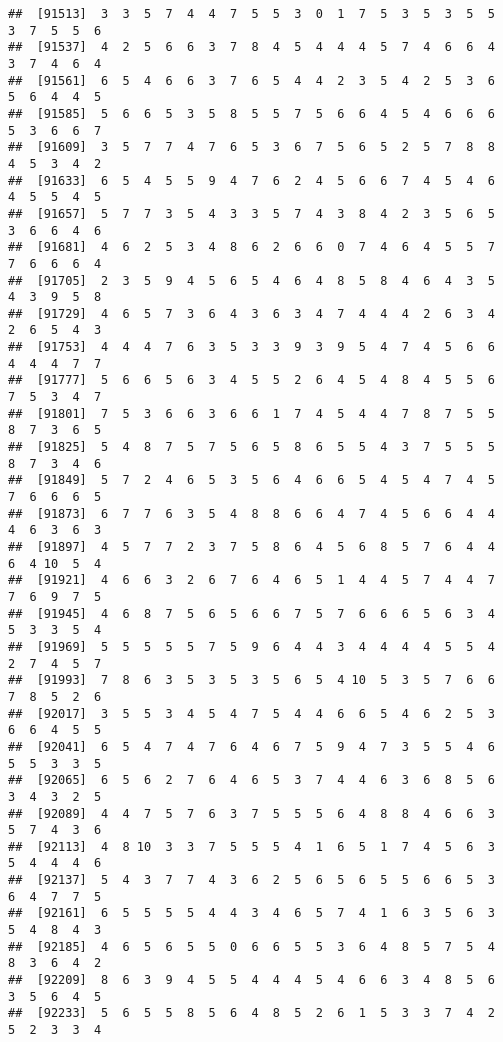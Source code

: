 \documentclass[
]{book}
\begin{document}
\begin{verbatim}
##  [91513]  3  3  5  7  4  4  7  5  5  3  0  1  7  5  3  5  3  5  5  3  7  5  5  6
##  [91537]  4  2  5  6  6  3  7  8  4  5  4  4  4  5  7  4  6  6  4  3  7  4  6  4
##  [91561]  6  5  4  6  6  3  7  6  5  4  4  2  3  5  4  2  5  3  6  5  6  4  4  5
##  [91585]  5  6  6  5  3  5  8  5  5  7  5  6  6  4  5  4  6  6  6  5  3  6  6  7
##  [91609]  3  5  7  7  4  7  6  5  3  6  7  5  6  5  2  5  7  8  8  4  5  3  4  2
##  [91633]  6  5  4  5  5  9  4  7  6  2  4  5  6  6  7  4  5  4  6  4  5  5  4  5
##  [91657]  5  7  7  3  5  4  3  3  5  7  4  3  8  4  2  3  5  6  5  3  6  6  4  6
##  [91681]  4  6  2  5  3  4  8  6  2  6  6  0  7  4  6  4  5  5  7  7  6  6  6  4
##  [91705]  2  3  5  9  4  5  6  5  4  6  4  8  5  8  4  6  4  3  5  4  3  9  5  8
##  [91729]  4  6  5  7  3  6  4  3  6  3  4  7  4  4  4  2  6  3  4  2  6  5  4  3
##  [91753]  4  4  4  7  6  3  5  3  3  9  3  9  5  4  7  4  5  6  6  4  4  4  7  7
##  [91777]  5  6  6  5  6  3  4  5  5  2  6  4  5  4  8  4  5  5  6  7  5  3  4  7
##  [91801]  7  5  3  6  6  3  6  6  1  7  4  5  4  4  7  8  7  5  5  8  7  3  6  5
##  [91825]  5  4  8  7  5  7  5  6  5  8  6  5  5  4  3  7  5  5  5  8  7  3  4  6
##  [91849]  5  7  2  4  6  5  3  5  6  4  6  6  5  4  5  4  7  4  5  7  6  6  6  5
##  [91873]  6  7  7  6  3  5  4  8  8  6  6  4  7  4  5  6  6  4  4  4  6  3  6  3
##  [91897]  4  5  7  7  2  3  7  5  8  6  4  5  6  8  5  7  6  4  4  6  4 10  5  4
##  [91921]  4  6  6  3  2  6  7  6  4  6  5  1  4  4  5  7  4  4  7  7  6  9  7  5
##  [91945]  4  6  8  7  5  6  5  6  6  7  5  7  6  6  6  5  6  3  4  5  3  3  5  4
##  [91969]  5  5  5  5  5  7  5  9  6  4  4  3  4  4  4  4  5  5  4  2  7  4  5  7
##  [91993]  7  8  6  3  5  3  5  3  5  6  5  4 10  5  3  5  7  6  6  7  8  5  2  6
##  [92017]  3  5  5  3  4  5  4  7  5  4  4  6  6  5  4  6  2  5  3  6  6  4  5  5
##  [92041]  6  5  4  7  4  7  6  4  6  7  5  9  4  7  3  5  5  4  6  5  5  3  3  5
##  [92065]  6  5  6  2  7  6  4  6  5  3  7  4  4  6  3  6  8  5  6  3  4  3  2  5
##  [92089]  4  4  7  5  7  6  3  7  5  5  5  6  4  8  8  4  6  6  3  5  7  4  3  6
##  [92113]  4  8 10  3  3  7  5  5  5  4  1  6  5  1  7  4  5  6  3  5  4  4  4  6
##  [92137]  5  4  3  7  7  4  3  6  2  5  6  5  6  5  5  6  6  5  3  6  4  7  7  5
##  [92161]  6  5  5  5  5  4  4  3  4  6  5  7  4  1  6  3  5  6  3  5  4  8  4  3
##  [92185]  4  6  5  6  5  5  0  6  6  5  5  3  6  4  8  5  7  5  4  8  3  6  4  2
##  [92209]  8  6  3  9  4  5  5  4  4  4  5  4  6  6  3  4  8  5  6  3  5  6  4  5
##  [92233]  5  6  5  5  8  5  6  4  8  5  2  6  1  5  3  3  7  4  2  5  2  3  3  4

\end{verbatim}
\end{document}
